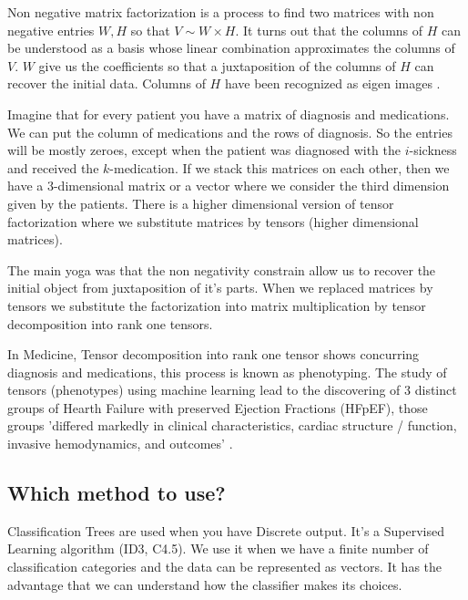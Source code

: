 \documentclass[11pt,letterpaper]{report}
\begin{document}
Non negative matrix factorization is a process to find two matrices with non negative entries $W,H$ so that $V\sim W\times H$. It turns out that the columns of $H$ can be understood as a basis whose linear combination approximates the columns of $V$. $W$ give us the coefficients so that a juxtaposition of the columns of  $H$ can recover the initial data. Columns of $H$ have been recognized as eigen images \cite{Lee1999}.  
 
 

Imagine that for every patient you have a matrix of diagnosis and medications. We can put the column of medications and the rows of diagnosis. So the entries will be mostly zeroes, except when the patient was diagnosed with the $i$-sickness and received the $k$-medication. If we stack this matrices on each other, then we have a 3-dimensional matrix or a vector where we consider the third dimension given by the patients. There is a higher dimensional version of tensor factorization  where we substitute  matrices by tensors (higher dimensional matrices). 
 
The main yoga was that the non negativity constrain allow us to recover the initial object from juxtaposition of it's parts. When we  replaced matrices by tensors we substitute the factorization into matrix multiplication by tensor decomposition into rank one tensors. 
 
 
In Medicine, Tensor decomposition into rank one tensor shows concurring diagnosis and medications, this process is known as phenotyping\cite{Ho}.  The study of tensors (phenotypes) using machine learning lead to the discovering of 3 distinct groups of Hearth Failure with preserved Ejection Fractions (HFpEF), those groups 'differed markedly in clinical characteristics, cardiac structure / function, invasive hemodynamics, and outcomes' \cite{Shah2015}.
 
 

			
		
\subsection{Which method to use?}
Classification Trees are used when you have Discrete output. It's a Supervised Learning algorithm (ID3, C4.5). We use it when we have a finite number of classification categories and the data can be represented as vectors.
It has the advantage that we can understand how the classifier makes its choices.
\end{document}
